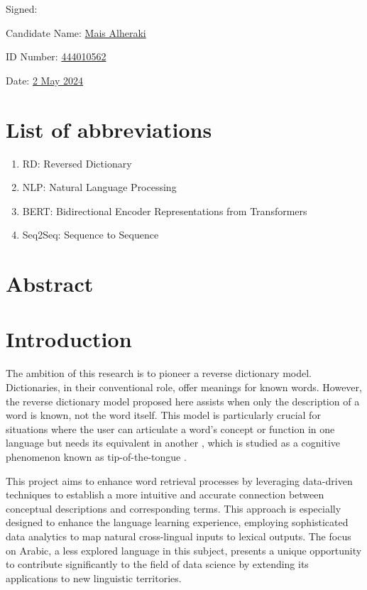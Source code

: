 \documentclass[15pt]{article}
\begin{document}
\noindent
Signed:

\noindent
Candidate Name: \underline{Mais Alheraki}

\noindent
ID Number: \underline{444010562}

\noindent
Date: \underline{2 May 2024}



\newpage

\thispagestyle{empty}
\listoffigures
\newpage
\thispagestyle{empty}
\listoftables
\newpage

\section*{List of abbreviations}
\begin{enumerate}
    \item[] RD: Reversed Dictionary
    \item[] NLP: Natural Language Processing
    \item[] BERT: Bidirectional Encoder Representations from Transformers
    \item[] Seq2Seq: Sequence to Sequence
\end{enumerate}
\newpage

\section*{Abstract}


\newpage

\section{Introduction}


The ambition of this research is to pioneer a reverse dictionary model. Dictionaries, in their conventional role, offer meanings for known words. However, the reverse dictionary model proposed here assists when only the description of a word is known, not the word itself. This model is particularly crucial for situations where the user can articulate a word's concept or function in one language but needs its equivalent in another \cite{Siddique2019}, which is studied as a cognitive phenomenon known as tip-of-the-tongue \cite{Brown1966}.

This project aims to enhance word retrieval processes by leveraging data-driven techniques to establish a more intuitive and accurate connection between conceptual descriptions and corresponding terms. This approach is especially designed to enhance the language learning experience, employing sophisticated data analytics to map natural cross-lingual inputs to lexical outputs. The focus on Arabic, a less explored language in this subject, presents a unique opportunity to contribute significantly to the field of data science by extending its applications to new linguistic territories.
\end{document}
